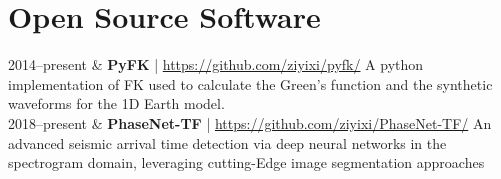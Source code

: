 \section{Open Source Software}

\begin{EntriesTable}{0.18}{0.02}{0.8}
2014--present & \textbf{PyFK} | \url{https://github.com/ziyixi/pyfk/} \newline
                A python implementation of FK used to calculate the Green's function and the synthetic waveforms for the 1D Earth model. \\
2018--present & \textbf{PhaseNet-TF} | \url{https://github.com/ziyixi/PhaseNet-TF/} \newline
                An advanced seismic arrival time detection via deep neural networks in the spectrogram domain, leveraging cutting-Edge image segmentation approaches \\
\end{EntriesTable}
